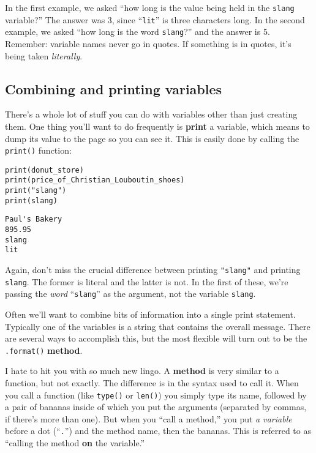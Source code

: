 In the first example, we asked ``how long is the value being held in the
\texttt{slang} variable?'' The answer was 3, since ``\texttt{lit}'' is three
characters long. In the second example, we asked ``how long is the word
\texttt{\textquotesingle slang\textquotesingle}?'' and the answer is 5. Remember: variable names never go in
quotes. If something is in quotes, it's being taken \textit{literally}.


\subsection{Combining and printing variables}

There's a whole lot of stuff you can do with variables other than just creating
them. One thing you'll want to do frequently is \textbf{print} a variable,
which means to dump its value to the page so you can see it. This is easily
done by calling the \texttt{print()} function:

\begin{Verbatim}[fontsize=\small,samepage=true,frame=single,framesep=3mm]
print(donut_store)
print(price_of_Christian_Louboutin_shoes)
print("slang")
print(slang)
\end{Verbatim}

\begin{Verbatim}[fontsize=\small,samepage=true,frame=leftline,framesep=5mm,framerule=1mm]
Paul's Bakery
895.95
slang
lit
\end{Verbatim}

Again, don't miss the crucial difference between printing \texttt{"slang"} and
printing \texttt{slang}. The former is literal and the latter is not. In the
first of these, we're passing the \textit{word} ``\texttt{slang}'' as the
argument, not the variable \texttt{slang}.

Often we'll want to combine bits of information into a single print statement.
Typically one of the variables is a string that contains the overall message.
There are several ways to accomplish this, but the most flexible will turn out
to be the \texttt{.format()} \textbf{method}.

I hate to hit you with so much new lingo. A \textbf{method} is very similar to
a function, but not exactly. The difference is in the syntax used to call it.
When you call a function (like \texttt{type()} or \texttt{len()}) you simply
type its name, followed by a pair of bananas inside of which you put the
arguments (separated by commas, if there's more than one). But when you ``call
a method,'' you put \textit{a variable} before a dot (``\texttt{.}'') and the
method name, then the bananas. This is referred to as ``calling the method
\textbf{on} the variable.''

